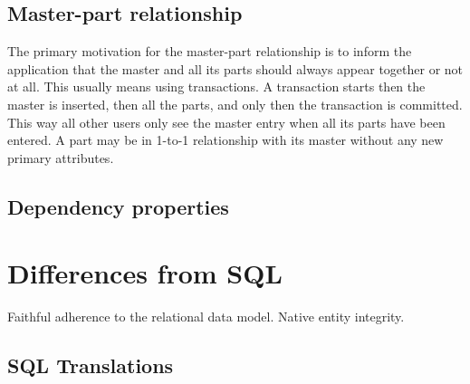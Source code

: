 \documentclass[letter,10pt]{article}
\begin{document}
\subsection{Master-part relationship}
The primary motivation for the master-part relationship is to inform the application that the master and all its parts should always appear together or not at all.  
This usually means using transactions.  
A transaction starts then the master is inserted, then all the parts, and only then the transaction is committed.  
This way all other users only see the master entry when all its parts have been entered.
A part may be in 1-to-1 relationship with its master without any new primary attributes.
\subsection{Dependency properties}

\appendix

\section{Differences from SQL}
Faithful adherence to the relational data model. 
Native entity integrity.

\subsection{SQL Translations}



\end{document}
